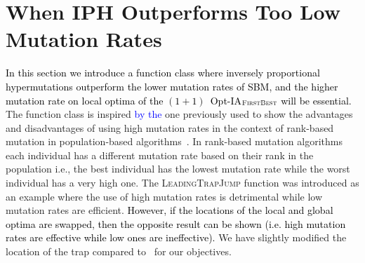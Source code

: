 \documentclass[lettersize,journal]{IEEEtran}
\newcommand{\new}[1]{\textcolor{black}{#1}}
\newcommand{\rev}[1]{\textcolor{blue}{#1}}
\begin{document}
 
 
\section{When IPH Outperforms Too Low Mutation Rates}\label{sec:ltj}
\new{In this section we introduce a function class where inversely proportional hypermutations outperform the lower mutation rates of SBM, and the higher mutation rate on local optima of the $(1+1)$~Opt-IA$_{\textsc{FirstBest}}$ will be essential.}
The function class is inspired \rev{by the} one previously used to show the advantages and disadvantages of using high mutation rates in the context of rank-based mutation in population-based algorithms~\cite{OlivetoLehreNeumann09}.
In rank-based mutation algorithms~\cite{RankBasedMutation} each individual has a different mutation rate based on their rank in the population i.e., the best individual has the lowest mutation rate while the worst individual has a very high one.
The \textsc{LeadingTrapJump} function was introduced as an example where the use of high mutation rates is detrimental while low mutation rates are efficient. \new{However, if the locations of the local and global optima are swapped, then the opposite result can be shown (i.e. high mutation rates are effective while low ones are ineffective).}
We have slightly modified the location of the trap compared to~\cite{OlivetoLehreNeumann09} for our objectives. 
\end{document}

